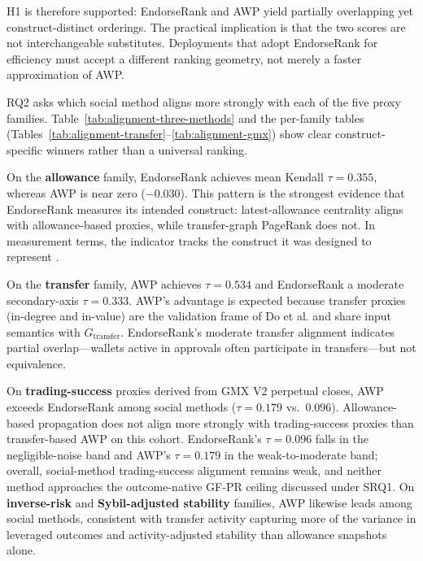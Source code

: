 H1 is therefore supported: EndorseRank and AWP yield partially overlapping yet construct-distinct orderings. The practical implication is that the two scores are not interchangeable substitutes. Deployments that adopt EndorseRank for efficiency must accept a different ranking geometry, not merely a faster approximation of AWP.


RQ2 asks which social method aligns more strongly with each of the five proxy families. Table~\ref{tab:alignment-three-methods} and the per-family tables (Tables~\ref{tab:alignment-transfer}--\ref{tab:alignment-gmx}) show clear construct-specific winners rather than a universal ranking.

On the \textbf{allowance} family, EndorseRank achieves mean Kendall $\tau=0.355$, whereas AWP is near zero ($-0.030$). This pattern is the strongest evidence that EndorseRank measures its intended construct: latest-allowance centrality aligns with allowance-based proxies, while transfer-graph PageRank does not. In measurement terms, the indicator tracks the construct it was designed to represent .

On the \textbf{transfer} family, AWP achieves $\tau=0.534$ and EndorseRank a moderate secondary-axis $\tau=0.333$. AWP's advantage is expected because transfer proxies (in-degree and in-value) are the validation frame of Do et al. and share input semantics with $G_{\text{transfer}}$. EndorseRank's moderate transfer alignment indicates partial overlap---wallets active in approvals often participate in transfers---but not equivalence.

On \textbf{trading-success} proxies derived from GMX V2 perpetual closes, AWP exceeds EndorseRank among social methods ($\tau=0.179$ vs.\ $0.096$). Allowance-based propagation does not align more strongly with trading-success proxies than transfer-based AWP on this cohort. EndorseRank's $\tau=0.096$ falls in the negligible-noise band and AWP's $\tau=0.179$ in the weak-to-moderate band; overall, social-method trading-success alignment remains weak, and neither method approaches the outcome-native GF-PR ceiling discussed under SRQ1. On \textbf{inverse-risk} and \textbf{Sybil-adjusted stability} families, AWP likewise leads among social methods, consistent with transfer activity capturing more of the variance in leveraged outcomes and activity-adjusted stability than allowance snapshots alone.

